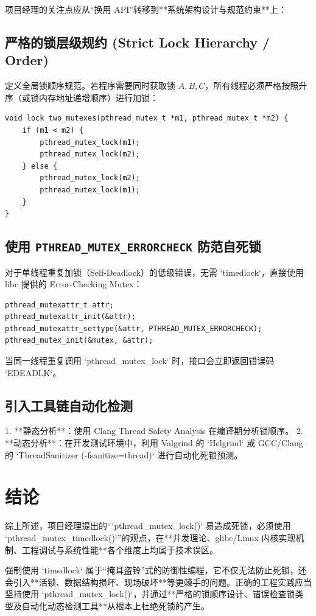\documentclass[12pt,a4paper]{article}
\begin{document}
项目经理的关注点应从“换用 API”转移到**系统架构设计与规范约束**上：

\subsection{严格的锁层级规约 (Strict Lock Hierarchy / Order)}
定义全局锁顺序规范。若程序需要同时获取锁 $A, B, C$，所有线程必须严格按照升序（或锁内存地址递增顺序）进行加锁：
\begin{lstlisting}
void lock_two_mutexes(pthread_mutex_t *m1, pthread_mutex_t *m2) {
    if (m1 < m2) {
        pthread_mutex_lock(m1);
        pthread_mutex_lock(m2);
    } else {
        pthread_mutex_lock(m2);
        pthread_mutex_lock(m1);
    }
}
\end{lstlisting}

\subsection{使用 \texttt{PTHREAD\_MUTEX\_ERRORCHECK} 防范自死锁}
对于单线程重复加锁（Self-Deadlock）的低级错误，无需 `timedlock`，直接使用 libc 提供的 Error-Checking Mutex：
\begin{lstlisting}
pthread_mutexattr_t attr;
pthread_mutexattr_init(&attr);
pthread_mutexattr_settype(&attr, PTHREAD_MUTEX_ERRORCHECK);
pthread_mutex_init(&mutex, &attr);
\end{lstlisting}
当同一线程重复调用 `pthread\_mutex\_lock` 时，接口会立即返回错误码 `EDEADLK`。

\subsection{引入工具链自动化检测}
1. **静态分析**：使用 Clang Thread Safety Analysis 在编译期分析锁顺序。
2. **动态分析**：在开发测试环境中，利用 Valgrind 的 `Helgrind` 或 GCC/Clang 的 `ThreadSanitizer (-fsanitize=thread)` 进行自动化死锁预测。

\section{结论}

综上所述，项目经理提出的“`pthread\_mutex\_lock()` 易造成死锁，必须使用 `pthread\_mutex\_timedlock()`”的观点，在**并发理论、glibc/Linux 内核实现机制、工程调试与系统性能**各个维度上均属于技术误区。

强制使用 `timedlock` 属于“掩耳盗铃”式的防御性编程，它不仅无法防止死锁，还会引入**活锁、数据结构损坏、现场破坏**等更棘手的问题。正确的工程实践应当坚持使用 `pthread\_mutex\_lock()`，并通过**严格的锁顺序设计、错误检查锁类型及自动化动态检测工具**从根本上杜绝死锁的产生。
\end{document}
